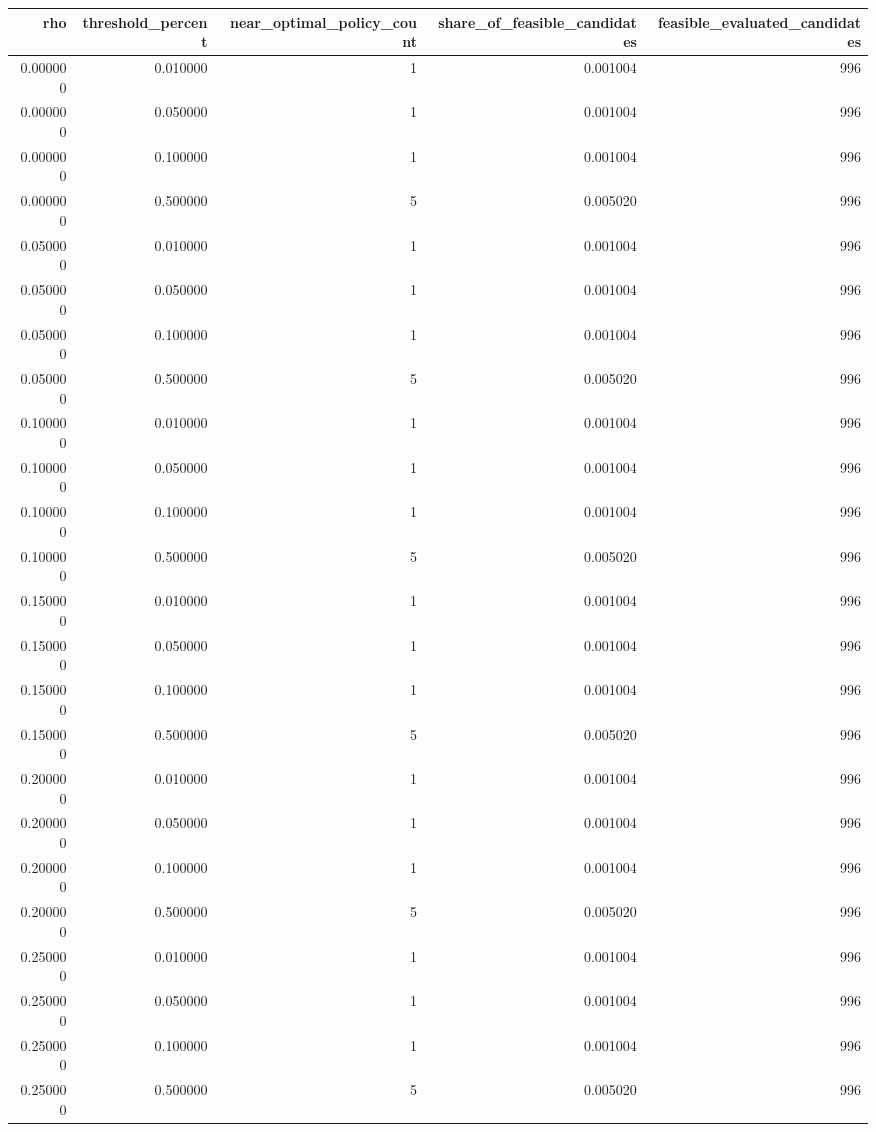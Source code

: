 \begin{tabular}{rrrrr}
\toprule
rho & threshold\_percent & near\_optimal\_policy\_count & share\_of\_feasible\_candidates & feasible\_evaluated\_candidates \\
\midrule
0.000000 & 0.010000 & 1 & 0.001004 & 996 \\
0.000000 & 0.050000 & 1 & 0.001004 & 996 \\
0.000000 & 0.100000 & 1 & 0.001004 & 996 \\
0.000000 & 0.500000 & 5 & 0.005020 & 996 \\
0.050000 & 0.010000 & 1 & 0.001004 & 996 \\
0.050000 & 0.050000 & 1 & 0.001004 & 996 \\
0.050000 & 0.100000 & 1 & 0.001004 & 996 \\
0.050000 & 0.500000 & 5 & 0.005020 & 996 \\
0.100000 & 0.010000 & 1 & 0.001004 & 996 \\
0.100000 & 0.050000 & 1 & 0.001004 & 996 \\
0.100000 & 0.100000 & 1 & 0.001004 & 996 \\
0.100000 & 0.500000 & 5 & 0.005020 & 996 \\
0.150000 & 0.010000 & 1 & 0.001004 & 996 \\
0.150000 & 0.050000 & 1 & 0.001004 & 996 \\
0.150000 & 0.100000 & 1 & 0.001004 & 996 \\
0.150000 & 0.500000 & 5 & 0.005020 & 996 \\
0.200000 & 0.010000 & 1 & 0.001004 & 996 \\
0.200000 & 0.050000 & 1 & 0.001004 & 996 \\
0.200000 & 0.100000 & 1 & 0.001004 & 996 \\
0.200000 & 0.500000 & 5 & 0.005020 & 996 \\
0.250000 & 0.010000 & 1 & 0.001004 & 996 \\
0.250000 & 0.050000 & 1 & 0.001004 & 996 \\
0.250000 & 0.100000 & 1 & 0.001004 & 996 \\
0.250000 & 0.500000 & 5 & 0.005020 & 996 \\
\bottomrule
\end{tabular}
